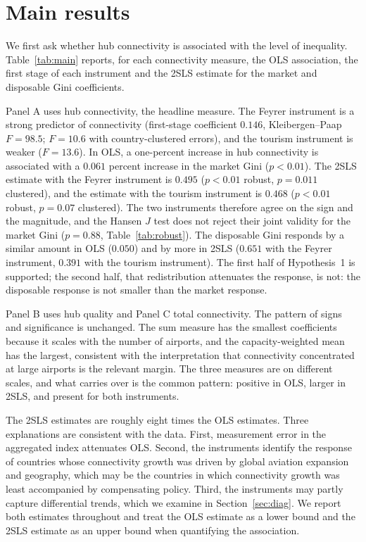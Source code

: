\documentclass[12pt]{article}
\begin{document}
\section{Main results}
\label{sec:results}
We first ask whether hub connectivity is associated with the level of inequality. Table~\ref{tab:main} reports, for each connectivity measure, the OLS association, the first stage of each instrument and the 2SLS estimate for the market and disposable Gini coefficients.

Panel A uses hub connectivity, the headline measure. The Feyrer instrument is a strong predictor of connectivity (first-stage coefficient $0.146$, Kleibergen--Paap $F=98.5$; $F=10.6$ with country-clustered errors), and the tourism instrument is weaker ($F=13.6$). In OLS, a one-percent increase in hub connectivity is associated with a $0.061$ percent increase in the market Gini ($p<0.01$). The 2SLS estimate with the Feyrer instrument is $0.495$ ($p<0.01$ robust, $p=0.011$ clustered), and the estimate with the tourism instrument is $0.468$ ($p<0.01$ robust, $p=0.07$ clustered). The two instruments therefore agree on the sign and the magnitude, and the Hansen $J$ test does not reject their joint validity for the market Gini ($p=0.88$, Table~\ref{tab:robust}). The disposable Gini responds by a similar amount in OLS ($0.050$) and by more in 2SLS ($0.651$ with the Feyrer instrument, $0.391$ with the tourism instrument). The first half of Hypothesis~1 is supported; the second half, that redistribution attenuates the response, is not: the disposable response is not smaller than the market response.

Panel B uses hub quality and Panel C total connectivity. The pattern of signs and significance is unchanged. The sum measure has the smallest coefficients because it scales with the number of airports, and the capacity-weighted mean has the largest, consistent with the interpretation that connectivity concentrated at large airports is the relevant margin. The three measures are on different scales, and what carries over is the common pattern: positive in OLS, larger in 2SLS, and present for both instruments.

The 2SLS estimates are roughly eight times the OLS estimates. Three explanations are consistent with the data. First, measurement error in the aggregated index attenuates OLS. Second, the instruments identify the response of countries whose connectivity growth was driven by global aviation expansion and geography, which may be the countries in which connectivity growth was least accompanied by compensating policy. Third, the instruments may partly capture differential trends, which we examine in Section~\ref{sec:diag}. We report both estimates throughout and treat the OLS estimate as a lower bound and the 2SLS estimate as an upper bound when quantifying the association.
\end{document}
